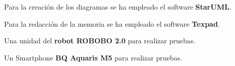  Para la creación de los diagramas se ha empleado el software \textbf{StarUML}.
 
 Para la redacción de la memoria se ha empleado el software \textbf{Texpad}.
 
 Una unidad del \textbf{robot ROBOBO 2.0} para realizar pruebas.
 
 Un Smartphone \textbf{BQ Aquaris M5} para realizar pruebas.
 
 
 
  
 
 




